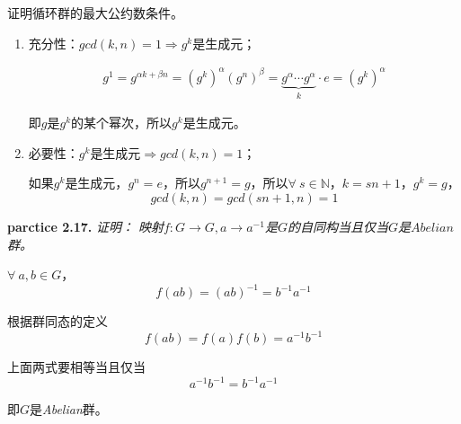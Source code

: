 \begin{mdframed}
    \begin{question}
        证明循环群的最大公约数条件。
    \end{question}
    \begin{enumerate}
        \item 充分性：$gcd(k,n)=1\Rightarrow g^k$是生成元；
        
        \begin{equation}
            \begin{aligned}
                g^1=g^{\alpha k+\beta n}=(g^k)^\alpha(g^n)^\beta=\underbrace{g^\alpha\cdots g^\alpha}_{k}\cdot e=(g^k)^\alpha
            \end{aligned}
        \end{equation}
        
        即$g$是$g^k$的某个幂次，所以$g^k$是生成元。

        \item 必要性：$g^k$是生成元$\Rightarrow gcd(k,n)=1$；
        
        如果$g^k$是生成元，$g^n=e$，所以$g^{n+1}=g$，所以$\forall\ s\in \mathbb{N}$，$k=sn+1$，$g^{k}=g$，
        \begin{equation}
            gcd(k,n)=gcd(sn+1,n)=1
        \end{equation}

    \end{enumerate}
\end{mdframed}

\begin{mdframed}
    \textbf{parctice 2.17.} \textsl{证明： 映射$f:G\rightarrow G,a\rightarrow a^{-1}$是$G$的自同构当且仅当$G$是$Abelian$群。}
    \vspace*{0.8em}

    $\forall\ a,b\in G$，
    \begin{equation}
        f(ab)=(ab)^{-1}=b^{-1}a^{-1}
    \end{equation}

    根据群同态的定义
    \begin{equation}
        f(ab)=f(a)f(b)=a^{-1}b^{-1}
    \end{equation}

    上面两式要相等当且仅当
    \begin{equation}
        a^{-1}b^{-1}=b^{-1}a^{-1}
    \end{equation}

    即$G$是\textsl{Abelian}群。

\end{mdframed}

